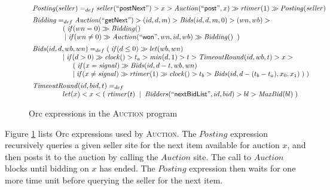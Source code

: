 \documentclass{eptcs}
\newcommand {\tab} {\mbox{\hspace {0.2in}}}
\begin{document}
\begin{figure} 	
	\centering
\begin{small}
\[
\begin{array}{l}
\mathit{Posting}(\mathit{seller}) 
    =_{def} \mathit{seller}(\mathsf{``postNext"}) > x > \mathit{Auction}(\mathsf{``post"}, x) \gg 
     \mathit{rtimer}(1) \gg \mathit{Posting}(\mathit{seller}) 
    \vspace{0.07in} \\
    
\mathit{Bidding} 
   =_{def}  \mathit{Auction}(``\mathsf{getNext}") > (id, d, m) > 
        \mathit{Bids}(id, d, m, 0) > (wn, wb) > \\
    \tab\tab\tab ( \; \mathit{if} (wn = 0) \gg \mathit{Bidding}() \\
    \tab\tab\tab \; | \; \mathit{if} (wn \neq 0) \gg \mathit{Auction}(``\mathsf{won}", wn, id, wb) \gg \mathit{Bidding}() \;\;) 
        \vspace{0.07in} \\

    
\mathit{Bids} (id, d, wb, wn) 
   =_{def}  (\;  \mathit{if} (d \leq 0) \gg \mathit{let}(wb, wn) \\
    \tab\tab\tab       | \; \mathit{if} (d > 0) \gg \mathit{clock}() > t_{a} > \mathit{min}(d, 1) > t > \mathit{TimeoutRound}(id, wb, t) > x > \\
     \tab\tab\tab\tab (\; \mathit{if}(x = \mathit{signal}) \gg \mathit{Bids}(id, d - t, wb, wn) \\
     \tab\tab\tab\tab | \; \mathit{if}(x \neq \mathit{signal}) \gg    
                   \mathit{rtimer}(1) \gg \mathit{clock}() > t_{b} > \mathit{Bids}(id, d - (t_{b} - t_{a}), x_{0}, x_{1}) 
            \; )
        \; ) 
            \vspace{0.07in} \\

        
\mathit{TimeoutRound} (id, bid, t) 
   =_{def}  \\ 
   \tab\tab\tab let(x) < x < ( \; \mathit{rtimer}(t) \;\; | \;\; \mathit{Bidders}(``\mathsf{nextBidList}", id, bid) > bl > \mathit{MaxBid}(bl) \;) 
\end{array}
\]
\end{small}
	\caption{Orc expressions in the \textsc{Auction} program}
    \label{fig:Auction-exprs}
\end{figure}


Figure \ref{fig:Auction-exprs} lists Orc expressions used by \textsc{Auction}. 
The $\mathit{Posting}$ expression recursively queries a given seller site for the next item available for auction $x$, and then posts it to the auction by calling the $\mathit{Auction}$ site. The call to $\mathit{Auction}$ blocks until bidding on $x$ has ended. The $\mathit{Posting}$ expression then waits for one more time unit before querying the seller for the next item.
\end{document}
